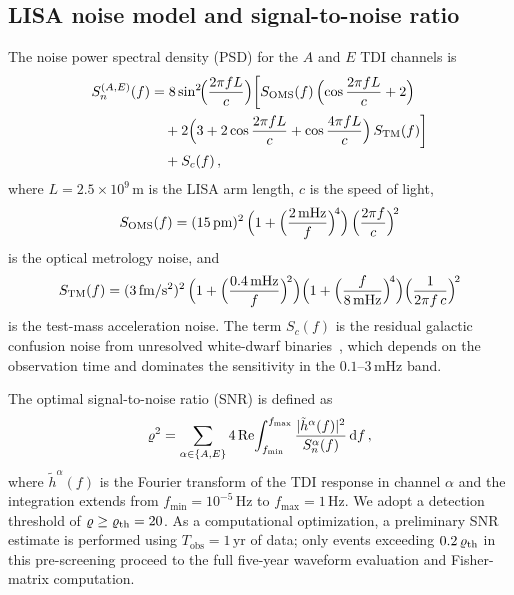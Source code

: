 \subsection{LISA noise model and signal-to-noise ratio}
\label{sec:snr}

The noise power spectral density (PSD) for the $A$ and $E$ TDI channels
is~\cite{Babak:2023lro}
\begin{align}
  S_n^{(A,E)}(f) &= 8\sin^2\!\Bigl(\frac{2\pi f L}{c}\Bigr)
  \biggl[
    S_\mathrm{OMS}(f)\,\Bigl(\cos\frac{2\pi f L}{c} + 2\Bigr)
  \nonumber\\
  &\quad + 2\Bigl(3 + 2\cos\frac{2\pi f L}{c}
    + \cos\frac{4\pi f L}{c}\Bigr)\,S_\mathrm{TM}(f)
  \biggr]
  \nonumber\\
  &\quad + S_c(f) \,,
  \label{eq:psd}
\end{align}
where $L = 2.5\times10^9\,\mathrm{m}$ is the LISA arm length,
$c$ is the speed of light,
\begin{equation}
  S_\mathrm{OMS}(f) = (15\,\mathrm{pm})^2\,
  \Bigl(1 + \Bigl(\frac{2\,\mathrm{mHz}}{f}\Bigr)^{\!4}\Bigr)\,
  \Bigl(\frac{2\pi f}{c}\Bigr)^{\!2}
  \label{eq:s_oms}
\end{equation}
is the optical metrology noise, and
\begin{equation}
  S_\mathrm{TM}(f) = (3\,\mathrm{fm/s^2})^2\,
  \Bigl(1 + \Bigl(\frac{0.4\,\mathrm{mHz}}{f}\Bigr)^{\!2}\Bigr)
  \Bigl(1 + \Bigl(\frac{f}{8\,\mathrm{mHz}}\Bigr)^{\!4}\Bigr)
  \Bigl(\frac{1}{2\pi f\, c}\Bigr)^{\!2}
  \label{eq:s_tm}
\end{equation}
is the test-mass acceleration noise.
The term $S_c(f)$ is the residual galactic confusion noise from unresolved
white-dwarf binaries~\cite{Cornish:2017oic}, which depends on
the observation time and dominates the sensitivity in the
$0.1$--$3\,\mathrm{mHz}$ band.

The optimal signal-to-noise ratio (SNR) is defined as
\begin{equation}
  \varrho^2 = \sum_{\alpha \in \{A,E\}}
  4\,\mathrm{Re}\!\int_{f_\mathrm{min}}^{f_\mathrm{max}}
  \frac{|\tilde{h}^\alpha(f)|^2}{S_n^{\alpha}(f)}\,\mathrm{d}f \,,
  \label{eq:snr}
\end{equation}
where $\tilde{h}^\alpha(f)$ is the Fourier transform of the TDI response in
channel $\alpha$ and the integration extends from
$f_\mathrm{min} = 10^{-5}\,\mathrm{Hz}$ to
$f_\mathrm{max} = 1\,\mathrm{Hz}$.
We adopt a detection threshold of $\varrho \geq \varrho_\mathrm{th} = 20$.
As a computational optimization, a preliminary SNR estimate is performed
using $T_\mathrm{obs} = 1\,\mathrm{yr}$ of data; only events exceeding
$0.2\,\varrho_\mathrm{th}$ in this pre-screening proceed to the full
five-year waveform evaluation and Fisher-matrix computation.

